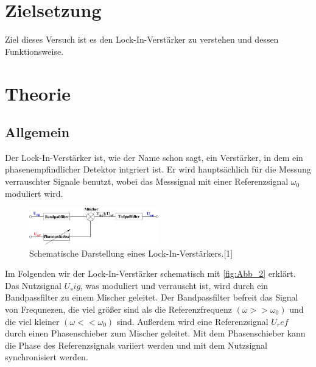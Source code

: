 \section{Zielsetzung}
\label{sec:Zielsetzung}
Ziel dieses Versuch ist es den Lock-In-Verstärker zu verstehen und dessen Funktionsweise.

\section{Theorie}
\label{sec:Theorie}
 \subsection{Allgemein} %
 \label{sub:Allgemein}
 Der Lock-In-Verstärker ist, wie der Name schon sagt, ein Verstärker, in dem ein phasenempfindlicher Detektor intgriert ist.
 Er wird hauptsächlich für die Messung verrauschter Signale benutzt, wobei das Messsignal mit einer Referenzsignal $\omega_0$ moduliert wird.
 \begin{figure}[H]
    \centering
    \includegraphics[width=0.5\textwidth]{build/Abb_1.pdf}
    \caption {Schematische Darstellung eines Lock-In-Verstärkers.[1]\cite{v303}}
    \label{fig:Abb_1}
\end{figure}
Im Folgenden wir der Lock-In-Verstärker schematisch mit \autoref{fig:Abb_2} erklärt.
Das Nutzsignal $U_sig$, was moduliert und verrauscht ist, wird durch ein Bandpassfilter zu einem Mischer geleitet.
Der Bandpassfilter befreit das Signal von Frequnezen, die viel größer sind als die Referenzfrequenz $(\omega >> \omega_0)$ und die viel kleiner $(\omega << \omega_0)$ sind.
Außerdem wird eine Referenzsignal $U_ref$ durch einen Phasenschieber zum Mischer geleitet.
Mit dem Phasenschieber kann die Phase des Referenzsignals variiert werden und mit dem Nutzsignal synchronisiert werden.
 
